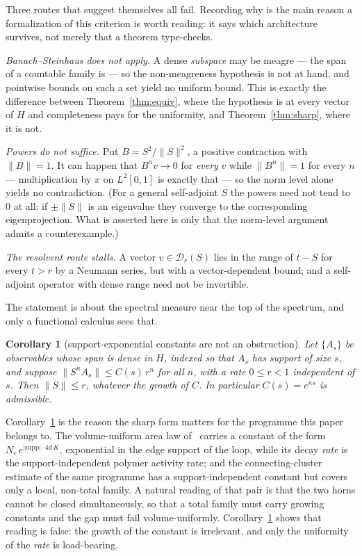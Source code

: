 \documentclass[11pt]{article}
\newtheorem{corollary}[theorem]{Corollary}
\theoremstyle{definition}
\begin{document}
Three routes that suggest themselves all fail.  Recording why is the main
reason a formalization of this criterion is worth reading: it says which
architecture survives, not merely that a theorem type-checks.

\smallskip\noindent\emph{Banach--Steinhaus does not apply.}  A dense
\emph{subspace} may be meagre --- the span of a countable family is --- so
the non-meagreness hypothesis is not at hand, and pointwise bounds on such
a set yield no uniform bound.  This is exactly the difference between
Theorem~\ref{thm:equiv}, where the hypothesis is at every vector of $H$
and completeness pays for the uniformity, and Theorem~\ref{thm:sharp},
where it is not.

\smallskip\noindent\emph{Powers do not suffice.}  Put
$B = S^2/\|S\|^2$, a positive contraction with $\|B\| = 1$.  It can happen
that $B^n v \to 0$ for \emph{every} $v$ while $\|B^n\| = 1$ for every $n$
--- multiplication by $x$ on $L^2[0,1]$ is exactly that --- so the norm
level alone yields no contradiction.  (For a general self-adjoint $S$ the
powers need not tend to $0$ at all: if $\pm\|S\|$ is an eigenvalue they
converge to the corresponding eigenprojection.  What is asserted here is
only that the norm-level argument admits a counterexample.)

\smallskip\noindent\emph{The resolvent route stalls.}  A vector
$v \in \mathcal{D}_r(S)$ lies in the range of $t - S$ for every $t > r$ by
a Neumann series, but with a vector-dependent bound; and a self-adjoint
operator with dense range need not be invertible.

\smallskip\noindent The statement is about the spectral measure near the
top of the spectrum, and only a functional calculus sees that.

\begin{corollary}[support-exponential constants are not an obstruction]
\label{cor:noobstruction}
Let $\{A_s\}$ be observables whose span is dense in $H$, indexed so that
$A_s$ has support of size $s$, and suppose $\|S^n A_s\| \le
C(s)\,r^n$ for all $n$, with a rate $0 \le r < 1$ independent of $s$.  Then
$\|S\| \le r$, whatever the growth of $C$.  In particular $C(s) =
e^{\kappa s}$ is admissible.
\end{corollary}

Corollary~\ref{cor:noobstruction} is the reason the sharp form matters
for the programme this paper belongs to.  The volume-uniform area
law of~\cite{ErikssonAreaLaw} carries a constant of the form
$N_c\,e^{|\mathrm{supp}| \cdot 4d\,K}$, exponential in the edge support
of the loop, while its decay \emph{rate} is the support-independent
polymer activity rate; and the connecting-cluster estimate of the same
programme has a support-independent constant but covers only a local,
non-total family.  A natural reading of that pair is that the two horns
cannot be closed simultaneously, so that a total family must carry
growing constants and the gap must fail volume-uniformly.
Corollary~\ref{cor:noobstruction} shows that reading is false: the growth
of the constant is irrelevant, and only the uniformity of the
\emph{rate} is load-bearing.
\end{document}
